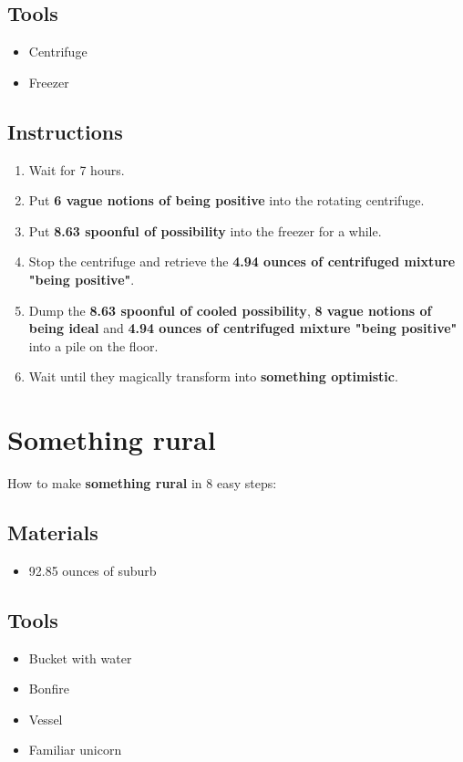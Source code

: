 \documentclass{article}
\begin{document}
\subsection{Tools}\begin{itemize}
\item 
Centrifuge
\item 
Freezer
\end{itemize}
\subsection{Instructions}\begin{enumerate}
\item 
Wait for 7 hours.
\item 
Put \textbf{6 vague notions of being positive} into the rotating centrifuge.
\item 
Put \textbf{8.63 spoonful of possibility} into the freezer for a while.
\item 
Stop the centrifuge and retrieve the \textbf{4.94 ounces of centrifuged mixture "being positive"}.
\item 
Dump the \textbf{8.63 spoonful of cooled possibility}, \textbf{8 vague notions of being ideal} and \textbf{4.94 ounces of centrifuged mixture "being positive"} into a pile on the floor.
\item 
Wait until they magically transform into \textbf{something optimistic}.
\end{enumerate}
\newpage
\section{Something rural}How to make \textbf{something rural} in 8 easy steps:

\subsection{Materials}\begin{itemize}
\item 
92.85 ounces of suburb
\end{itemize}
\subsection{Tools}\begin{itemize}
\item 
Bucket with water
\item 
Bonfire
\item 
Vessel
\item 
Familiar unicorn
\end{itemize}
\end{document}
